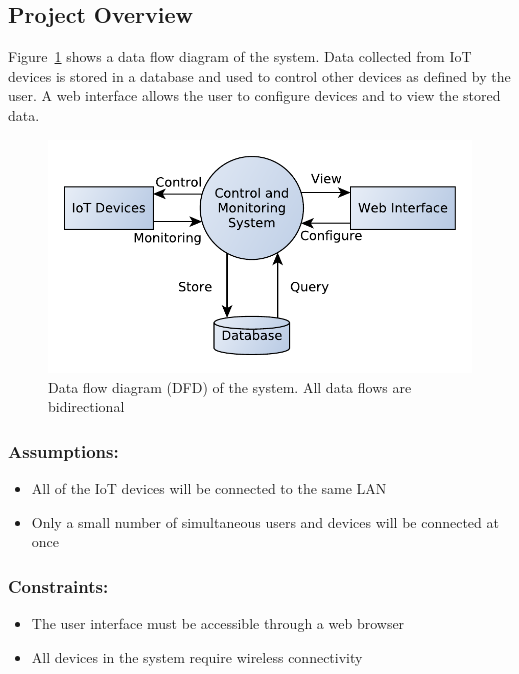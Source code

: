 \documentclass[10pt,twocolumn]{witseiepaper}
\begin{document}
	\subsection{Project Overview}
	
	Figure~\ref{fig:dfd} shows a data flow diagram of the system. Data collected from IoT devices is stored in a database and used to control other devices as defined by the user. A web interface allows the user to configure devices and to view the stored data.
	\begin{figure}[!htb]
		\includegraphics[width=\columnwidth]{data-flow-1}
		\caption{Data flow diagram (DFD) of the system. All data flows are bidirectional}
		\label{fig:dfd}
	\end{figure}
	
	\subsubsection{Assumptions:}
	\begin{itemize}
		\item All of the IoT devices will be connected to the same LAN
		\item Only a small number of simultaneous users and devices will be connected at once
	\end{itemize}
	\subsubsection{Constraints:}
	\begin{itemize}
		\item The user interface must be accessible through a web browser
		\item All devices in the system require wireless connectivity
	\end{itemize}
	
\end{document}

